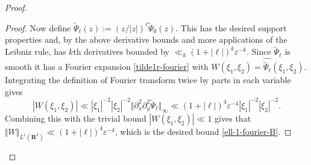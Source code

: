 \documentclass[11pt,reqno]{amsart}
\numberwithin{equation}{section}
\theoremstyle{definition}
\theoremstyle{remark}
\newcommand{\eps}{\varepsilon}
\newcommand\R{\mathbf{R}}
\begin{document}
\begin{proof}
\begin{proof}
Now define $\tilde\Psi_{\ell}(z) := (z/|z|)^{\ell} \tilde\Psi_0(z)$. This has the desired support properties and, by the above derivative bounds and more applications of the Leibniz rule, has $k$th derivatives bounded by $\ll_k (1 + |\ell|)^k\eps^{-k}$. Since $\tilde \Psi_{\ell}$ is smooth it has a Fourier expansion \cref{tilde1r-fourier} with $W(\xi_1, \xi_2) = \widehat{\tilde\Psi_{\ell}}(\xi_1, \xi_2)$. Integrating the definition of Fourier transform twice by parts in each variable gives
\[ |W(\xi_1, \xi_2)| \ll |\xi_1|^{-2} |\xi_2|^{-2} \Vert \partial_x^2 \partial_y^2 \tilde\Psi_{\ell} \Vert_{\infty} \ll (1 + |\ell|)^4 \eps^{-4} |\xi_1|^{-2} |\xi_2|^{-2}.\]
Combining this with the trivial bound $|W(\xi_1, \xi_2)| \ll 1$ gives that $\Vert W \Vert_{L^1(\R^2)} \ll (1+ |\ell|)^4\eps^{-4}$, which is the desired bound \cref{ell-1-fourier-B}.
\end{proof}




\end{proof}
\end{document}
